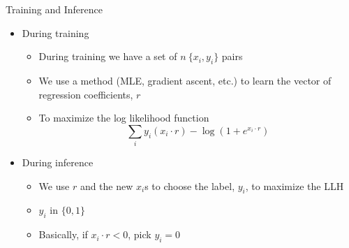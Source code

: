 \documentclass[aspectratio=169]{beamer}
\begin{document}
\begin{frame}{Training and Inference}

\begin{itemize}
\item During training
\begin{itemize}
\item During training we have a set of $n\ \{x_i, y_i\}$ pairs
\item We use a method (MLE, gradient ascent, etc.) to learn the vector of regression coefficients, $r$
\item To maximize the log likelihood function
$$\sum_i y_i (x_i \cdot r) - \log (1 + e^{x_i \cdot r})$$
\end{itemize}
\item During inference
\begin{itemize}
\item We use $r$ and the new $x_i$s to choose the label,  $y_i$, to maximize the LLH
\item $y_i$ in $\{0,1\}$
\item Basically, if $x_i \cdot r < 0$, pick $y_i = 0$
\end{itemize}
\end{itemize}
\end{frame}
\end{document}
